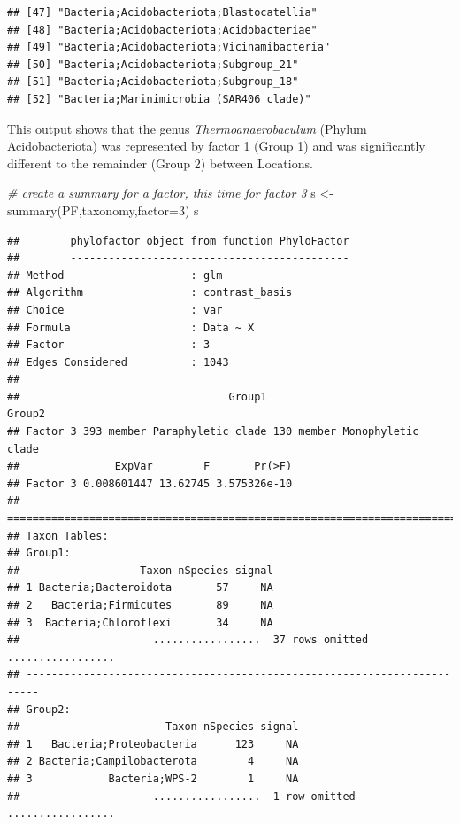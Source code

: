 \documentclass[
]{book}
\newenvironment{Shaded}{\begin{snugshade}}{\end{snugshade}}
\newcommand{\AttributeTok}[1]{\textcolor[rgb]{0.77,0.63,0.00}{#1}}
\newcommand{\CommentTok}[1]{\textcolor[rgb]{0.56,0.35,0.01}{\textit{#1}}}
\newcommand{\DecValTok}[1]{\textcolor[rgb]{0.00,0.00,0.81}{#1}}
\newcommand{\FunctionTok}[1]{\textcolor[rgb]{0.00,0.00,0.00}{#1}}
\newcommand{\NormalTok}[1]{#1}
\newcommand{\OtherTok}[1]{\textcolor[rgb]{0.56,0.35,0.01}{#1}}
\begin{document}
\begin{verbatim}
## [47] "Bacteria;Acidobacteriota;Blastocatellia"                                                              
## [48] "Bacteria;Acidobacteriota;Acidobacteriae"                                                              
## [49] "Bacteria;Acidobacteriota;Vicinamibacteria"                                                            
## [50] "Bacteria;Acidobacteriota;Subgroup_21"                                                                 
## [51] "Bacteria;Acidobacteriota;Subgroup_18"                                                                 
## [52] "Bacteria;Marinimicrobia_(SAR406_clade)"
\end{verbatim}

This output shows that the genus \emph{Thermoanaerobaculum} (Phylum Acidobacteriota) was represented by factor 1 (Group 1) and was significantly different to the remainder (Group 2) between Locations.

\begin{Shaded}
\begin{Highlighting}[]
\CommentTok{\# create a summary for a factor, this time for factor 3}
\NormalTok{s }\OtherTok{\textless{}{-}} \FunctionTok{summary}\NormalTok{(PF,taxonomy,}\AttributeTok{factor=}\DecValTok{3}\NormalTok{)}
\NormalTok{s}
\end{Highlighting}
\end{Shaded}

\begin{verbatim}
##        phylofactor object from function PhyloFactor
##        --------------------------------------------
## Method                    : glm
## Algorithm                 : contrast_basis
## Choice                    : var
## Formula                   : Data ~ X
## Factor                    : 3
## Edges Considered          : 1043
## 
##                                 Group1                        Group2
## Factor 3 393 member Paraphyletic clade 130 member Monophyletic clade
##               ExpVar        F       Pr(>F)
## Factor 3 0.008601447 13.62745 3.575326e-10
## ========================================================================
## Taxon Tables:
## Group1:
##                   Taxon nSpecies signal
## 1 Bacteria;Bacteroidota       57     NA
## 2   Bacteria;Firmicutes       89     NA
## 3  Bacteria;Chloroflexi       34     NA
##                     .................  37 rows omitted .................
## ------------------------------------------------------------------------
## Group2:
##                       Taxon nSpecies signal
## 1   Bacteria;Proteobacteria      123     NA
## 2 Bacteria;Campilobacterota        4     NA
## 3            Bacteria;WPS-2        1     NA
##                     .................  1 row omitted .................
\end{verbatim}
\end{document}
